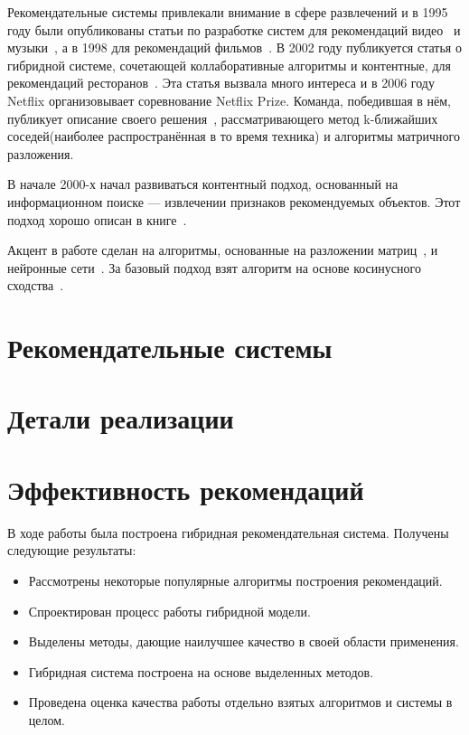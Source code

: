 \documentclass[a4paper,article,14pt]{extarticle}
\begin{document}
Рекомендательные системы привлекали внимание в сфере развлечений и в 1995 году были опубликованы статьи по разработке систем для рекомендаций видео~\cite{bellcore} и музыки~\cite{ringo}, а в 1998 для рекомендаций фильмов~\cite{movielens}.
В 2002 году публикуется статья о гибридной системе, сочетающей коллаборативные алгоритмы и контентные, для рекомендаций ресторанов~\cite{hybrid}.
Эта статья вызвала много интереса и в 2006 году Netflix организовывает соревнование Netflix Prize.
Команда, победившая в нём, публикует описание своего решения~\cite{netflix}, рассматривающего метод k-ближайших соседей(наиболее распространённая в то время техника) и алгоритмы матричного разложения.

В начале 2000-х начал развиваться контентный подход, основанный на информационном поиске --- извлечении признаков рекомендуемых объектов.
Этот подход хорошо описан в книге~\cite{adaptive-web}.

Акцент в работе сделан на алгоритмы, основанные на разложении матриц~\cite{als, sgd}, и нейронные сети~\cite{nn}.
За базовый подход взят алгоритм на основе косинусного сходства~\cite{resnick}.

\pagebreak
\section{Рекомендательные системы}\label{sec:recommender_systems}


\pagebreak
\section{Детали реализации}\label{sec:program_realization}


\pagebreak
\section{Эффективность рекомендаций}\label{sec:algos_efficiency}


\pagebreak
{}
В ходе работы была построена гибридная рекомендательная система.
Получены следующие результаты:

\begin{itemize}
\item Рассмотрены некоторые популярные алгоритмы построения рекомендаций.
\item Спроектирован процесс работы гибридной модели.
\item Выделены методы, дающие наилучшее качество в своей области применения.
\item Гибридная система построена на основе выделенных методов.
\item Проведена оценка качества работы отдельно взятых алгоритмов и системы в целом.
\end{itemize}
\end{document}
